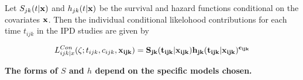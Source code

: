 Let $S_{jk}(t|\bf{x})$ and $h_{jk}(t|\bf{x})$ be the survival and hazard functions conditional on the covariates $\bf{x}$. Then the individual conditional likelohood contributions for each time $t_{ijk}$ in the IPD studies are given by

\begin{equation}
    L_{ijk|x}^{Con}(\zeta;t_{ijk},c_{ijk},\bf{x}_{ijk}) = S_{jk}(t_{ijk}|\bf{x}_{ijk})h_{jk}(t_{ijk}|\bf{x}_{ijk})^{c_{ijk}}
\end{equation}

\bf{The forms of $S$ and $h$ depend on the specific models chosen}.